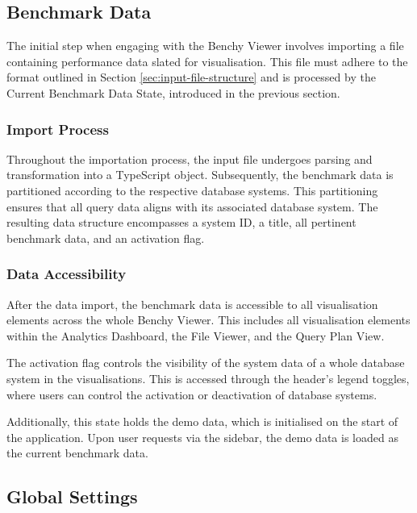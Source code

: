 \subsection{Benchmark Data}\label{sec:input-data}

The initial step when engaging with the Benchy Viewer involves importing a file containing performance data slated for visualisation. This file must adhere to the format outlined in Section \ref{sec:input-file-structure} and is processed by the Current Benchmark Data State, introduced in the previous section. 

\subsubsection{Import Process}

Throughout the importation process, the input file undergoes parsing and transformation into a TypeScript object. Subsequently, the benchmark data is partitioned according to the respective database systems. This partitioning ensures that all query data aligns with its associated database system. The resulting data structure encompasses a system ID, a title, all pertinent benchmark data, and an activation flag.

\subsubsection{Data Accessibility}

After the data import, the benchmark data is accessible to all visualisation elements across the whole Benchy Viewer. This includes all visualisation elements within the Analytics Dashboard, the File Viewer, and the Query Plan View.

The activation flag controls the visibility of the system data of a whole database system in the visualisations. This is accessed through the header's legend toggles, where users can control the activation or deactivation of database systems.

Additionally, this state holds the demo data, which is initialised on the start of the application. Upon user requests via the sidebar, the demo data is loaded as the current benchmark data.



\subsection{Global Settings}\label{sec:global-settings}

